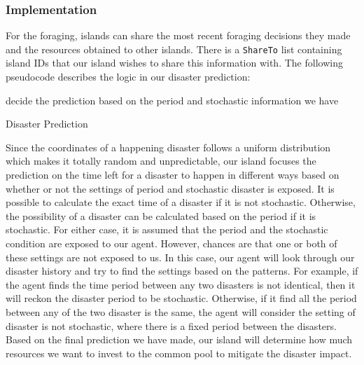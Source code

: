 \subsubsection{Implementation} \label{subsubsec:Team6_IIFO:Implementation}
For the foraging, islands can share the most recent foraging decisions they made and the resources obtained to other islands. There is a \texttt{ShareTo} list containing island IDs that our island wishes to share this information with. The following pseudocode describes the logic in our disaster prediction:
\begin{algorithm}[H]
\SetAlgoLined
    decide the prediction based on the period and stochastic information we have\;
    \caption{Disaster Prediction}
\end{algorithm}


Since the coordinates of a happening disaster follows a uniform distribution which makes it totally random and unpredictable, our island focuses the prediction on the time left for a disaster to happen in different ways based on whether or not the settings of period and stochastic disaster is exposed. It is possible to calculate the exact time of a disaster if it is not stochastic. Otherwise, the possibility of a disaster can be calculated based on the period if it is stochastic. For either case, it is assumed that the period and the stochastic condition are exposed to our agent. However, chances are that one or both of these settings are not exposed to us. In this case, our agent will look through our disaster history and try to find the settings based on the patterns. For example, if the agent finds the time period between any two disasters is not identical, then it will reckon the disaster period to be stochastic. Otherwise, if it find all the period between any of the two disaster is the same, the agent will consider the setting of disaster is not stochastic, where there is a fixed period between the disasters. Based on the final prediction we have made, our island will determine how much resources we want to invest to the common pool to mitigate the disaster impact.

